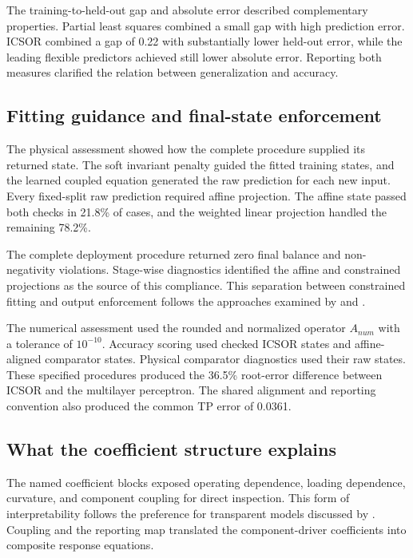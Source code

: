 The training-to-held-out gap and absolute error described complementary properties. Partial least squares combined a small gap with high prediction error. ICSOR combined a gap of 0.22 with substantially lower held-out error, while the leading flexible predictors achieved still lower absolute error. Reporting both measures clarified the relation between generalization and accuracy.

\subsection{Fitting guidance and final-state enforcement}

The physical assessment showed how the complete procedure supplied its returned state. The soft invariant penalty guided the fitted training states, and the learned coupled equation generated the raw prediction for each new input. Every fixed-split raw prediction required affine projection. The affine state passed both checks in 21.8\% of cases, and the weighted linear projection handled the remaining 78.2\%.

The complete deployment procedure returned zero final balance and non-negativity violations. Stage-wise diagnostics identified the affine and constrained projections as the source of this compliance. This separation between constrained fitting and output enforcement follows the approaches examined by \citet{Hansen2024} and \citet{KircherVotsmeier2025}.

The numerical assessment used the rounded and normalized operator $A_{num}$ with a tolerance of $10^{-10}$. Accuracy scoring used checked ICSOR states and affine-aligned comparator states. Physical comparator diagnostics used their raw states. These specified procedures produced the 36.5\% root-error difference between ICSOR and the multilayer perceptron. The shared alignment and reporting convention also produced the common TP error of 0.0361.

\subsection{What the coefficient structure explains}

The named coefficient blocks exposed operating dependence, loading dependence, curvature, and component coupling for direct inspection. This form of interpretability follows the preference for transparent models discussed by \citet{Rudin2019}. Coupling and the reporting map translated the component-driver coefficients into composite response equations.

